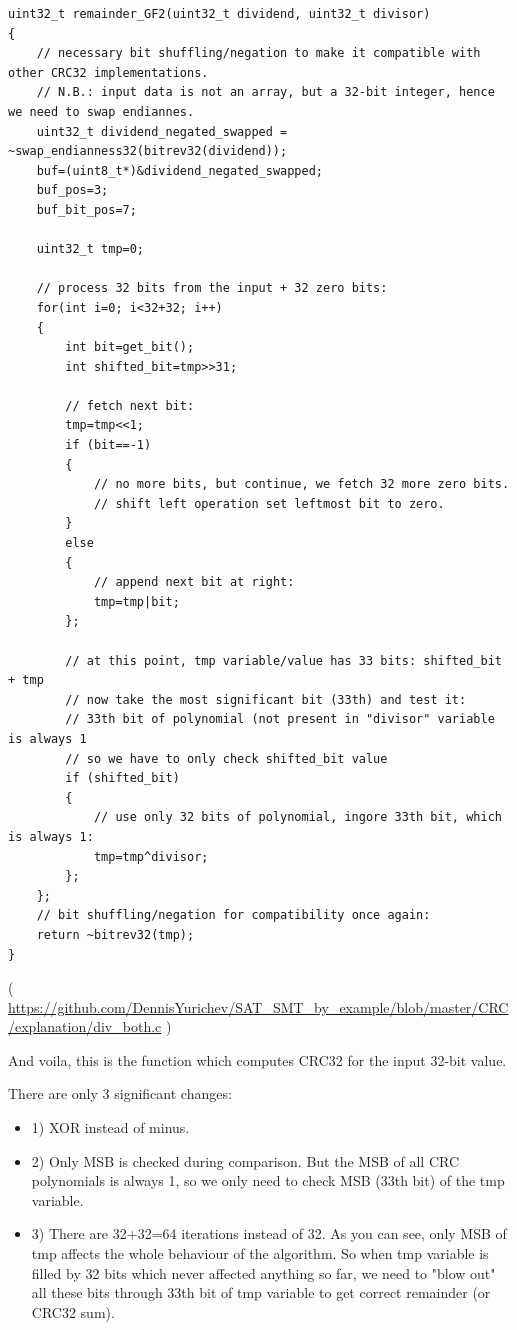 \begin{lstlisting}[style=customc]
uint32_t remainder_GF2(uint32_t dividend, uint32_t divisor)
{
	// necessary bit shuffling/negation to make it compatible with other CRC32 implementations.
	// N.B.: input data is not an array, but a 32-bit integer, hence we need to swap endiannes.
	uint32_t dividend_negated_swapped = ~swap_endianness32(bitrev32(dividend));
	buf=(uint8_t*)&dividend_negated_swapped;
	buf_pos=3;
	buf_bit_pos=7;

	uint32_t tmp=0;

	// process 32 bits from the input + 32 zero bits:
	for(int i=0; i<32+32; i++)
	{
		int bit=get_bit();
		int shifted_bit=tmp>>31;

		// fetch next bit:
		tmp=tmp<<1;
		if (bit==-1)
		{
			// no more bits, but continue, we fetch 32 more zero bits.
			// shift left operation set leftmost bit to zero.
		}
		else
		{
			// append next bit at right:
			tmp=tmp|bit;
		};

		// at this point, tmp variable/value has 33 bits: shifted_bit + tmp
		// now take the most significant bit (33th) and test it:
		// 33th bit of polynomial (not present in "divisor" variable is always 1
		// so we have to only check shifted_bit value
		if (shifted_bit)
		{
			// use only 32 bits of polynomial, ingore 33th bit, which is always 1:
			tmp=tmp^divisor;
		};
	};
	// bit shuffling/negation for compatibility once again:
	return ~bitrev32(tmp);
}
\end{lstlisting}

( \url{https://github.com/DennisYurichev/SAT_SMT_by_example/blob/master/CRC/explanation/div_both.c} )

And voila, this is the function which computes CRC32 for the input 32-bit value.

There are only 3 significant changes:

\begin{itemize}

\item 1) XOR instead of minus.

\item 2) Only MSB is checked during comparison. But the MSB of all CRC polynomials is always 1,
so we only need to check MSB (33th bit) of the tmp variable.

\item 3) There are 32+32=64 iterations instead of 32.
As you can see, only MSB of tmp affects the whole behaviour of the algorithm.
So when tmp variable is filled by 32 bits which never affected anything so far,
we need to "blow out" all these bits through 33th bit of tmp variable to get correct remainder (or CRC32 sum).

\end{itemize}


